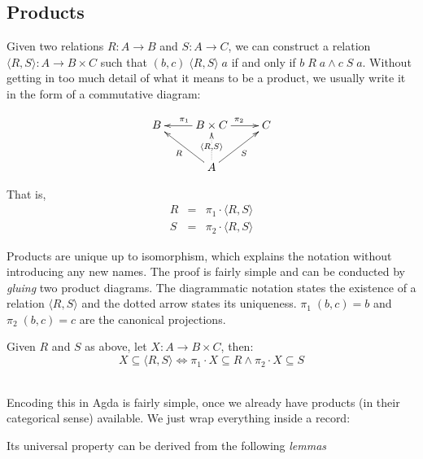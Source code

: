 

\subsection{Products}
\label{sec:relations:products}

Given two relations $R : A \rightarrow B$ and $S : A \rightarrow C$, we can construct a relation
$\langle R , S \rangle : A \rightarrow B \times C$ such that $(b,c)\;\langle R , S \rangle\;a$ if and only if $b\;R\;a \wedge c\;S\;a$.
Without getting in too much detail of what it means to be a product, we usually write
it in the form of a commutative diagram:

\begin{displaymath}
\xymatrix{%
B & B \times C \ar[l]_{\pi_1} \ar[r]^{\pi_2} & C \\
  &     A \ar@{..>}[u]|{\langle R , S \rangle} \ar[ul]^{R} \ar[ur]_{S}
  &
}
\end{displaymath} 

That is,
\begin{eqnarray*}
  R &=& \pi_1 \cdot \langle R , S \rangle \\
  S &=& \pi_2 \cdot \langle R , S \rangle
\end{eqnarray*}

Products are unique up to isomorphism, which explains the notation without introducing any new names.
The proof is fairly simple and can be conducted by \emph{gluing} two product diagrams.
The diagrammatic notation states the existence of a relation $\langle R , S \rangle$ and the dotted arrow
states its uniqueness. $\pi_1\;(b , c) = b$ and $\pi_2\;(b , c) = c$ are the canonical
projections.\\

\begin{mydef}
Given $R$ and $S$ as above, let $X : A \rightarrow B \times C$, then:
\[
  X \subseteq \langle R , S \rangle \Leftrightarrow \pi_1 \cdot X \subseteq R \wedge \pi_2 \cdot X \subseteq S
\]\\
\end{mydef}
Encoding this in Agda is fairly simple, once we already have products (in their categorical sense)
available. We just wrap everything inside a record:


Its universal property can be derived from the following \emph{lemmas}

\\
\\

